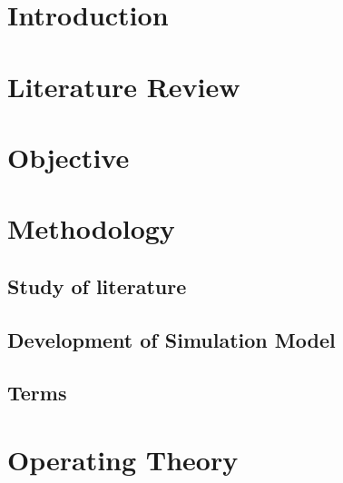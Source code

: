 \documentclass[12pt]{article}
\begin{document}

\tableofcontents
\newpage
\section{Introduction}
\section{Literature Review}
\section{Objective}
\section{Methodology}
\subsection{Study of literature}
\subsection{Development of Simulation Model}
\subsection{Terms}
\section{Operating Theory}
\end{document}
